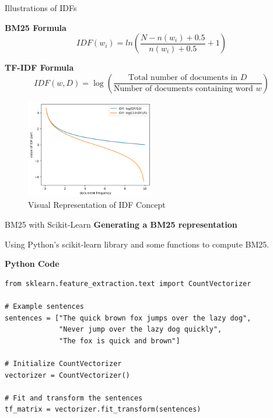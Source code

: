 \documentclass{beamer}
\begin{document}
\begin{frame}{Illustrations of IDFs}

\textbf{BM25 Formula}
\[ IDF(w_i) = ln(\frac{N - n(w_i) + 0.5}{n(w_i) + 0.5} + 1) \]

\textbf{TF-IDF Formula}
\[ IDF(w, D) = \log \left(\frac{\text{Total number of documents in } D}{\text{Number of documents containing word } w}\right) \]

\begin{figure}
  \centering
  \includegraphics[width=0.5\textwidth]{figures/idf.png}
  \caption{Visual Representation of IDF Concept}
\end{figure}

\end{frame}


\begin{frame}[fragile]{BM25 with Scikit-Learn}
\small
\textbf{Generating a BM25 representation}

Using Python's scikit-learn library and some functions to compute BM25.

\textbf{Python Code}

\begin{tcolorbox}[colback=lightgray, colframe=lightgray,
                  boxsep=0mm, arc=1mm, boxrule=0mm,
                  left=1mm, right=1mm, top=1mm, bottom=1mm]
\begin{Verbatim}[fontsize=\scriptsize, bgcolor=lightgray]
from sklearn.feature_extraction.text import CountVectorizer

# Example sentences
sentences = ["The quick brown fox jumps over the lazy dog",
             "Never jump over the lazy dog quickly",
             "The fox is quick and brown"]

# Initialize CountVectorizer
vectorizer = CountVectorizer()

# Fit and transform the sentences
tf_matrix = vectorizer.fit_transform(sentences)
\end{Verbatim}
\end{tcolorbox}

\end{frame}
\end{document}
